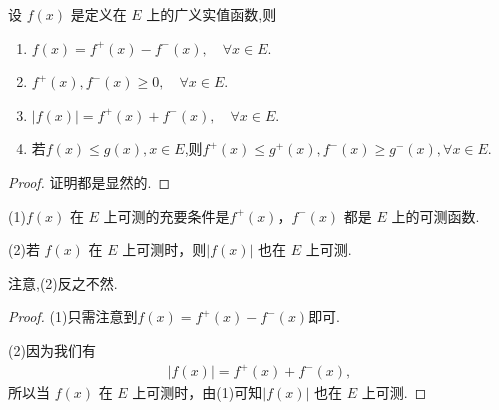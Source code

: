 \documentclass[../../main.tex]{subfiles}%
\begin{document}
\begin{lemma}\label{lemma:函数的正部和负部的基本性质}
设 \(f(x)\) 是定义在 \(E\) 上的广义实值函数,则
\begin{enumerate}[(1)]
\item $f(x)=f^+(x)-f^-(x),\quad \forall x\in E.$

\item $f^+(x),f^-(x)\geqslant 0,\quad \forall x\in E.$

\item $\left| f\left( x \right) \right|=f^+\left( x \right) +f^-\left( x \right) ,\quad \forall x\in E.$

\item 若$f(x)\leqslant g(x),x\in E$,则$f^+(x)\leqslant g^+(x),f^-(x)\geqslant g^-(x),\forall x\in E.$
\end{enumerate}
\end{lemma}
\begin{proof}
证明都是显然的.
\end{proof}

\begin{theorem}
(1)\(f(x)\) 在 \(E\) 上可测的充要条件是\(f^+(x)\)，\(f^-(x)\) 都是 \(E\) 上的可测函数.

(2)若 \(f(x)\) 在 \(E\) 上可测时，则\(|f(x)|\) 也在 \(E\) 上可测.
\end{theorem}
\begin{remark}
注意,(2)反之不然.
\end{remark}
\begin{proof}
(1)只需注意到$f(x) = f^+(x) - f^-(x)$即可.

(2)因为我们有
\begin{align*}
|f(x)| = f^+(x) + f^-(x), 
\end{align*}
所以当 \(f(x)\) 在 \(E\) 上可测时，由(1)可知\(|f(x)|\) 也在 \(E\) 上可测.
\end{proof}
\end{document}
